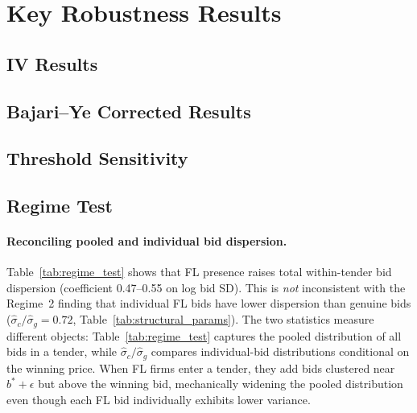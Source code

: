 \section{Key Robustness Results}
\label{app:robustness}

\subsection{IV Results}



\subsection{Bajari--Ye Corrected Results}



\subsection{Threshold Sensitivity}

\begin{table}[htbp]
\centering
\caption{Price Coefficient Across IQR Multiplier Thresholds}
\label{tab:threshold}

\end{table}

\subsection{Regime Test}



\paragraph{Reconciling pooled and individual bid dispersion.}
Table~\ref{tab:regime_test} shows that FL presence raises total within-tender bid dispersion (coefficient 0.47--0.55 on log bid SD). This is \emph{not} inconsistent with the Regime~2 finding that individual FL bids have lower dispersion than genuine bids ($\hat{\sigma}_c / \hat{\sigma}_g = 0.72$, Table~\ref{tab:structural_params}). The two statistics measure different objects: Table~\ref{tab:regime_test} captures the pooled distribution of all bids in a tender, while $\hat{\sigma}_c / \hat{\sigma}_g$ compares individual-bid distributions conditional on the winning price. When FL firms enter a tender, they add bids clustered near $b^* + \epsilon$ but above the winning bid, mechanically widening the pooled distribution even though each FL bid individually exhibits lower variance.

